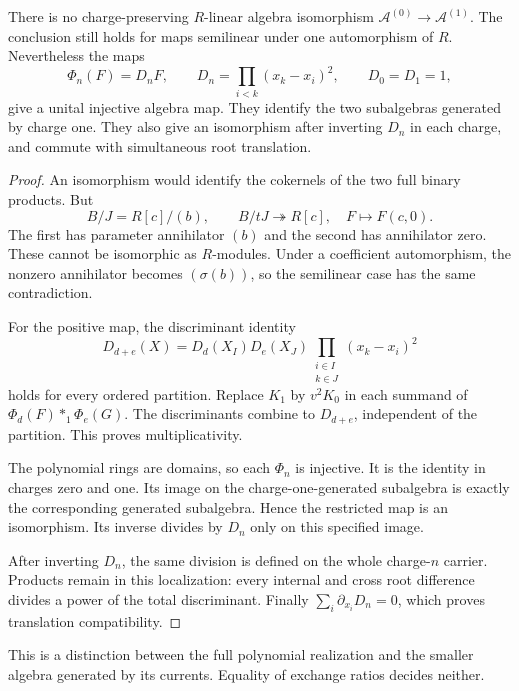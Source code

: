 \begin{theorem}\label{thm:vol2-hall-lattices}
There is no charge-preserving $R$-linear algebra isomorphism
$\mathcal A^{(0)}\to\mathcal A^{(1)}$.
The conclusion still holds for maps semilinear under one automorphism
of $R$.
Nevertheless the maps
\begin{equation}\label{eq:vol2-discriminant-map}
 \Phi_n(F)=D_nF,\qquad
 D_n=\prod_{i<k}(x_k-x_i)^2,\qquad D_0=D_1=1,
\end{equation}
give a unital injective algebra map.
They identify the two subalgebras generated by charge one.
They also give an isomorphism after inverting $D_n$ in each
charge, and commute with simultaneous root translation.
\end{theorem}
\begin{proof}
An isomorphism would identify the cokernels of the two full
binary products.
But
\[
 B/J=R[c]/(b),\qquad
 B/tJ\twoheadrightarrow R[c],\quad F\longmapsto F(c,0).
\]
The first has parameter annihilator $(b)$ and the second has
annihilator zero.
These cannot be isomorphic as $R$-modules.
Under a coefficient automorphism, the nonzero annihilator becomes
$(\sigma(b))$, so the semilinear case has the same contradiction.

For the positive map, the discriminant identity
\[
 D_{d+e}(X)
 =D_d(X_I)D_e(X_J)
    \prod_{\substack{i\in I\\ k\in J}}(x_k-x_i)^2
\]
holds for every ordered partition.
Replace $K_1$ by $v^2K_0$ in each summand of
$\Phi_d(F)*_1\Phi_e(G)$.
The discriminants combine to $D_{d+e}$, independent of the
partition. This proves multiplicativity.

The polynomial rings are domains, so each $\Phi_n$ is injective.
It is the identity in charges zero and one.
Its image on the charge-one-generated subalgebra is exactly the
corresponding generated subalgebra. Hence the restricted map is
an isomorphism.
Its inverse divides by $D_n$ only on this specified image.

After inverting $D_n$, the same division is defined on the whole
charge-$n$ carrier.
Products remain in this localization: every internal and cross
root difference divides a power of the total discriminant.
Finally $\sum_i\partial_{x_i}D_n=0$, which proves translation
compatibility.
\end{proof}

This is a distinction between the full polynomial realization and
the smaller algebra generated by its currents.
Equality of exchange ratios decides neither.


